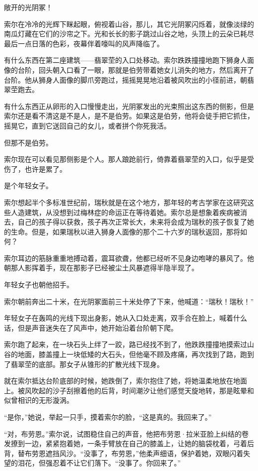 \documentclass[AutoFakeBold=true]{book}
\begin{document}
{\kaishu 敞开的光阴冢！}

索尔在冷冷的光辉下眯起眼，俯视着山谷，那儿，其它光阴冢闪烁着，就像淡绿的南瓜灯藏在它们的沙帘之下。光和长长的影子跳过山谷之地，头顶上的云朵已耗尽最后一点日落的色彩，夜幕伴着嚎叫的风声降临了。

有什么东西在第二座建筑——翡翠茔的入口处移动。索尔跌跌撞撞地跑下狮身人面像的台阶，回头朝入口看了一眼，那就是伯劳带着她女儿消失的地方，然后离开了台阶。他从狮身人面像的脚爪旁跑过，摇摇晃晃地沿着被风吹出的小径前进，朝翡翠茔跑去。

有什么东西正从卵形的入口慢慢走出，光阴冢发出的光束照出这东西的侧影，但是索尔还是看不清这是不是人，是不是伯劳。如果这是伯劳，他将会徒手把它抓住，摇晃它，直到它送回自己的女儿，或者拼个你死我活。

但那不是伯劳。

索尔现在可以看见那侧影是个人。那人踉跄前行，倚靠着翡翠茔的入口，似乎是受伤了，也许是累了。

是个年轻女子。

索尔想起半个多标准世纪前，瑞秋就是在这个地方，那年轻的考古学家在这研究这些人造建筑，从没想到过梅林症的命运正在等待着她。索尔总是想象着疾病被消去，自己的孩子得以获救，孩子再次正常长大，未来将会成为瑞秋的孩子恢复了她的生命。但是，如果瑞秋以进入狮身人面像的那个二十六岁的瑞秋返回，那将如何？

索尔耳边的筋脉重重地搏动着，震耳欲聋，他都已经听不见身边咆哮的暴风了。他朝那人影挥着手，现在那影子已经被尘土风暴遮得半隐半现了。

年轻女子也朝他招手。

索尔朝前奔出二十米，在光阴冢面前三十米处停了下来，他喊道：``瑞秋！瑞秋！''

年轻女子在轰鸣的光线下现出身影，她从入口处走离，双手合在脸上，喊着什么话，但是声音迷失在了风声中，她开始沿着台阶朝下爬。

索尔跑了起来，在一块石头上绊了一跤，路已经找不到了，他跌跌撞撞地摸索过山谷的地面，膝盖撞上一块低矮的大石头，但他毫不顾及疼痛，再次找到了路，跑到了翡翠茔的底部。那女子从锥形的扩散光线下现身。

就在索尔抵达台阶底部的时候，她跌倒了，索尔抱住了她，将她温柔地放在地面上。被风吹起的沙子刮擦着他的后背，时间潮汐让他们感觉天旋地转，那是眩晕和似曾相识的无形漩涡。

``是你，''她说，举起一只手，摸着索尔的脸，``这是真的。我回来了。''

``对，布劳恩。''索尔说，试图稳住自己的声音，他把布劳恩·拉米亚脸上纠结的卷发撩到一边，紧紧抱着她，一条手臂放在自己的膝盖上，让她的脑袋枕着，弓着后背，替布劳恩遮挡风沙。``没事了，布劳恩，''他柔声细语，保护着她，双眼闪着失望的泪花，但强忍着不让它们落下。``没事了。你回来了。''
\end{document}
